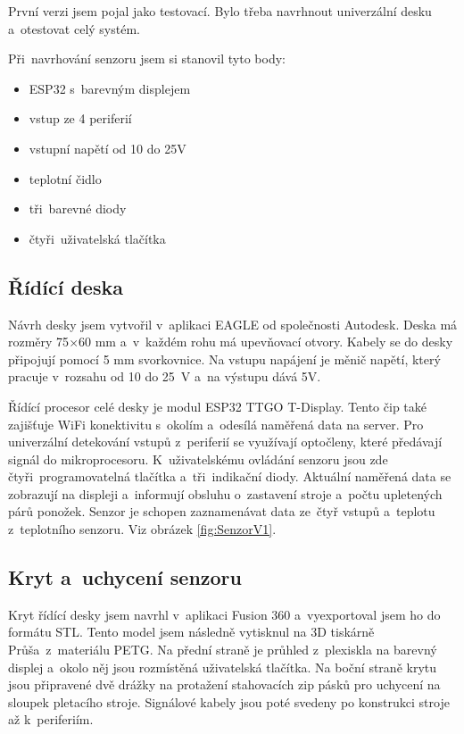 První verzi jsem pojal jako testovací. Bylo třeba navrhnout univerzální desku a~otestovat celý systém.

Při~navrhování senzoru jsem si stanovil tyto body:
\begin{itemize}
    \item ESP32 s~barevným displejem
    \item vstup ze 4 periferií
    \item vstupní napětí od 10 do 25V
    \item teplotní čidlo
    \item tři~barevné diody
    \item čtyři~uživatelská tlačítka
\end{itemize}


\subsection{Řídící deska}
Návrh desky jsem vytvořil v~aplikaci EAGLE od společnosti Autodesk. 
Deska má rozměry 75$\times$60 mm a~v~každém rohu má upevňovací otvory.
Kabely se do desky připojují pomocí 5 mm svorkovnice.
Na vstupu napájení je měnič napětí, který pracuje v~rozsahu od 10 do 25~V a~na výstupu dává 5V. 

Řídící procesor celé desky je modul ESP32 TTGO T-Display.
Tento čip také zajišťuje WiFi konektivitu s~okolím a~odesílá naměřená data na server.
Pro univerzální detekování vstupů z~periferií se využívají optočleny, které předávají signál do mikroprocesoru.
K~uživatelskému ovládání senzoru jsou zde čtyři~programovatelná tlačítka a~tři~indikační diody.
Aktuální naměřená data se zobrazují na displeji a~informují obsluhu o~zastavení stroje a~počtu upletených párů ponožek.
Senzor je schopen zaznamenávat data ze~čtyř vstupů a~teplotu z~teplotního senzoru. Viz obrázek \ref{fig:SenzorV1}.

\subsection{Kryt a~uchycení senzoru}
Kryt řídící desky jsem navrhl v~aplikaci Fusion 360 a~vyexportoval jsem ho do formátu STL.
Tento model jsem následně vytisknul na 3D tiskárně Průša~z~materiálu PETG.
Na přední straně je průhled z~plexiskla na barevný displej a~okolo něj jsou rozmístěná uživatelská tlačítka.
Na boční straně krytu jsou připravené dvě drážky na protažení stahovacích zip pásků pro uchycení na sloupek pletacího stroje.
Signálové kabely jsou poté svedeny po konstrukci stroje až k~periferiím.


